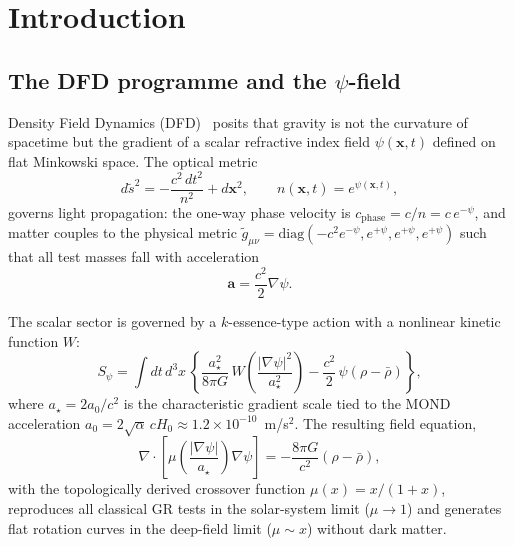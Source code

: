\documentclass[12pt,aps,prd,twocolumn,superscriptaddress,nofootinbib]{revtex4-2}
\newcommand{\astar}{a_\star}
\begin{document}
\section{Introduction}
\label{sec:intro}

\subsection{The DFD programme and the $\psi$-field}

Density Field Dynamics (DFD)~\cite{Alcock2025DFD} posits that gravity
is not the curvature of spacetime but the gradient of a scalar refractive
index field $\psi(\mathbf{x},t)$ defined on flat Minkowski space.  The
optical metric
\begin{equation}
  d\tilde{s}^2 = -\frac{c^2\,dt^2}{n^2} + d\mathbf{x}^2, \qquad
  n(\mathbf{x},t) = e^{\psi(\mathbf{x},t)},
  \label{eq:optical_metric}
\end{equation}
governs light propagation: the one-way phase velocity is
$c_{\mathrm{phase}} = c/n = c\,e^{-\psi}$, and matter couples to the
physical metric $\tilde{g}_{\mu\nu} = \mathrm{diag}(-c^2 e^{-\psi},
e^{+\psi}, e^{+\psi}, e^{+\psi})$ such that all test masses fall with
acceleration
\begin{equation}
  \mathbf{a} = \frac{c^2}{2}\nabla\psi.
  \label{eq:matter_accel}
\end{equation}

The scalar sector is governed by a $k$-essence-type action with a
nonlinear kinetic function $W$:
\begin{equation}
  S_\psi = \int dt\,d^3x\,\left\{
    \frac{\astar^2}{8\pi G}\,W\!\left(\frac{|\nabla\psi|^2}{\astar^2}\right)
    - \frac{c^2}{2}\,\psi(\rho - \bar{\rho})
  \right\},
  \label{eq:DFD_action}
\end{equation}
where $\astar = 2a_0/c^2$ is the characteristic gradient scale tied to
the MOND acceleration $a_0 = 2\sqrt{\alpha}\,cH_0 \approx
1.2\times 10^{-10}$~m/s$^2$.  The resulting field equation,
\begin{equation}
  \nabla\cdot\!\left[\mu\!\left(\frac{|\nabla\psi|}{\astar}\right)
  \nabla\psi\right] = -\frac{8\pi G}{c^2}(\rho - \bar{\rho}),
  \label{eq:field_eq}
\end{equation}
with the topologically derived crossover function
$\mu(x) = x/(1+x)$, reproduces all classical GR tests in the
solar-system limit ($\mu \to 1$) and generates flat rotation curves in
the deep-field limit ($\mu \sim x$) without dark matter.
\end{document}
